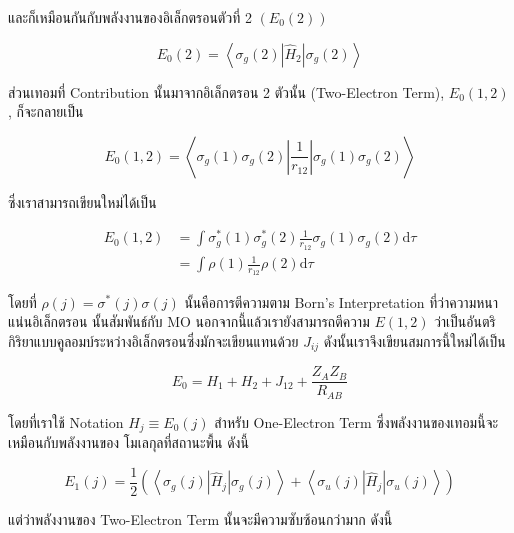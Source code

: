 \noindent และก็เหมือนกันกับพลังงานของอิเล็กตรอนตัวที่ 2 $(E_0(2))$

\begin{equation}
  E_0(2)
  =
  \left\langle
  \sigma_g(2)
  \left| \hat{H}_2 \right|
  \sigma_g(2)
  \right\rangle
\end{equation}

ส่วนเทอมที่ Contribution นั้นมาจากอิเล็กตรอน 2 ตัวนั้น (Two-Electron Term), $E_0(1,2)$, ก็จะกลายเป็น

\begin{equation}
  \label{eq:energy_one_electron_ground_state}
  E_0(1,2)
  =
  \left\langle
  \sigma_g(1) \sigma_g(2)\left|\frac{1}{r_{12}}\right| \sigma_g(1) \sigma_g(2)
  \right\rangle
\end{equation}

\noindent ซึ่งเราสามารถเขียนใหม่ได้เป็น

\begin{equation}
  \label{eq:energy_two_electron_ground_state}
  \begin{aligned}
    E_0(1,2)
     & = \int \sigma_g^*(1) \sigma_g^*(2) \frac{1}{r_{12}} \sigma_g(1) \sigma_g(2) \mathrm{d} \tau \\
     & = \int \rho(1) \frac{1}{r_{12}} \rho(2) \mathrm{d} \tau
  \end{aligned}
\end{equation}

\noindent โดยที่ $\rho(j) = \sigma^*(j) \sigma(j)$ นั้นคือการตีความตาม Born's Interpretation ที่ว่าความหนาแน่นอิเล็กตรอน%
นั้นสัมพันธ์กับ MO นอกจากนี้แล้วเรายังสามารถตีความ $E(1,2)$ ว่าเป็นอันตริกิริยาแบบคูลอมบ์ระหว่างอิเล็กตรอนซึ่งมักจะเขียนแทนด้วย $J_{i j}$
ดังนั้นเราจึงเขียนสมการนี้ใหม่ได้เป็น

\begin{equation}
  E_0
  =
  H_1 + H_2 + J_{12} + \frac{Z_A Z_B}{R_{A B}}
\end{equation}

\noindent โดยที่เราใช้ Notation $H_j \equiv E_0(j)$ สำหรับ One-Electron Term ซึ่งพลังงานของเทอมนี้จะเหมือนกับพลังงานของ%
โมเลกุลที่สถานะพื้น ดังนี้

\begin{equation}
  \label{eq:energy_one_electron_triplet_state}
  E_1(j)
  =
  \frac{1}{2}
  \left(
  \left\langle
  \sigma_g(j)\left|\hat{H}_j\right| \sigma_g(j)
  \right\rangle
  +
  \left\langle
  \sigma_u(j)\left|\hat{H}_j\right| \sigma_u(j)
  \right\rangle
  \right)
\end{equation}

\noindent แต่ว่าพลังงานของ Two-Electron Term นั้นจะมีความซับซ้อนกว่ามาก ดังนี้

